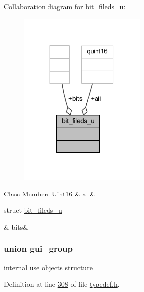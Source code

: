 Collaboration diagram for bit\+\_\+fileds\+\_\+u\+:
\nopagebreak
\begin{figure}[H]
\begin{center}
\leavevmode
\includegraphics[width=176pt]{d9/d21/a00240}
\end{center}
\end{figure}
\begin{DoxyFields}{Class Members}
\hypertarget{a00001_a1fbba220db38cb47889164192a2c8d6c}{\hyperlink{a00001_aae7407b021d43f7193a81a58cfb3e297}{Uint16}}\label{a00001_a1fbba220db38cb47889164192a2c8d6c}
&
all&
\\
\hline

\hypertarget{a00001_ae1bf57374285a54e9def627d4662cbe5}{struct \hyperlink{a00001_d1/d22/a00057}{bit\+\_\+fileds\+\_\+u}}\label{a00001_ae1bf57374285a54e9def627d4662cbe5}
&
bits&
\\
\hline

\end{DoxyFields}
\label{d9/da4/a00078}
\hypertarget{a00001_d9/da4/a00078}{}
\subsubsection{union gui\+\_\+group}
internal use objects structure 

Definition at line \hyperlink{a00001_source_l00308}{308} of file \hyperlink{a00001_source}{typedef.\+h}.



